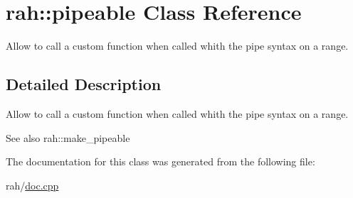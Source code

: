 \hypertarget{classrah_1_1pipeable}{}\section{rah\+::pipeable Class Reference}
\label{classrah_1_1pipeable}


Allow to call a custom function when called whith the \textquotesingle{}pipe\textquotesingle{} syntax on a range.  




\subsection{Detailed Description}
Allow to call a custom function when called whith the \textquotesingle{}pipe\textquotesingle{} syntax on a range. 

\begin{DoxySeeAlso}{See also}
rah\+::make\+\_\+pipeable 
\end{DoxySeeAlso}


The documentation for this class was generated from the following file\+:\begin{DoxyCompactItemize}
\item 
rah/\mbox{\hyperlink{doc_8cpp}{doc.\+cpp}}\end{DoxyCompactItemize}
